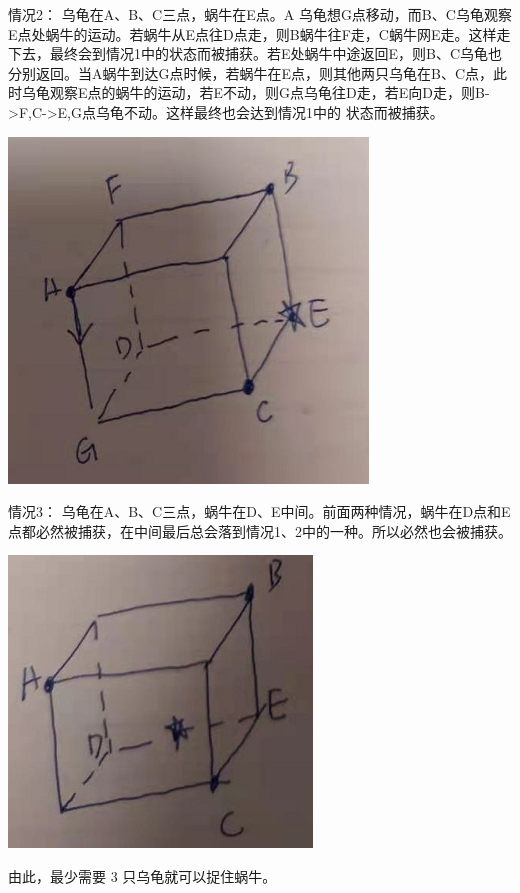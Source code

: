 \documentclass{article}
\begin{document}
\vspace{60pt}

情况2： 乌龟在A、B、C三点，蜗牛在E点。A 乌龟想G点移动，而B、C乌龟观察E点处蜗牛的运动。若蜗牛从E点往D点走，则B蜗牛往F走，C蜗牛网E走。这样走下去，最终会到情况1中的状态而被捕获。若E处蜗牛中途返回E，则B、C乌龟也分别返回。当A蜗牛到达G点时候，若蜗牛在E点，则其他两只乌龟在B、C点，此时乌龟观察E点的蜗牛的运动，若E不动，则G点乌龟往D走，若E向D走，则B->F,C->E,G点乌龟不动。这样最终也会达到情况1中的 状态而被捕获。

\includegraphics[scale=0.5]{cube03.png}

\vspace{60pt}

情况3： 乌龟在A、B、C三点，蜗牛在D、E中间。前面两种情况，蜗牛在D点和E点都必然被捕获，在中间最后总会落到情况1、2中的一种。所以必然也会被捕获。

\includegraphics[scale=0.5]{cube04.png}

由此，最少需要 3 只乌龟就可以捉住蜗牛。
\end{document}
